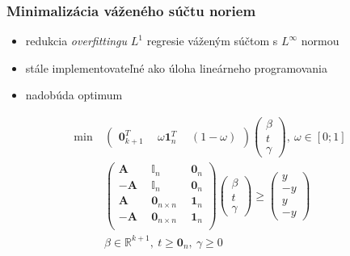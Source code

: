 \documentclass[presentation.tex]{subfiles}
\begin{document}
\begin{frame}
	\frametitle{Minimalizácia váženého súčtu noriem}
	
	\begin{itemize}
		\item redukcia \textit{overfittingu} $L^1$ regresie váženým súčtom s $L^{\infty}$ normou
		\item stále implementovateľné ako úloha lineárneho programovania
		\item nadobúda optimum
	\end{itemize}
{\scriptsize
	\setlength{\abovedisplayskip}{6pt}
	\setlength{\belowdisplayskip}{\abovedisplayskip}
	\setlength{\abovedisplayshortskip}{0pt}
	\setlength{\belowdisplayshortskip}{3pt}
\begin{align*}
	\text{min}~ &
	\left(
	\begin{array}{c|c|c}
		\mathbf{0}_{k+1}^T ~ & ~\omega\mathbf{1}_n^T ~& ~(1 - \omega)
	\end{array}
	\right)
	\left(
	\begin{array}{c}
		\beta \\
		\hline
		t \\
		\hline
		\gamma
	\end{array}
	\right), ~ \omega \in [0; 1]\\
	&\left(
	\begin{array}{c|c|c}
		\mathbf{A} ~&~ \mathbb{I}_n ~&~ \mathbf{0}_n \\
		\hline
		-\mathbf{A} ~&~ \mathbb{I}_n ~&~ \mathbf{0}_n \\
		\hline
		\mathbf{A} ~&~ \mathbf{0}_{n \times n} ~&~ \mathbf{1}_n \\
		\hline
		-\mathbf{A} ~&~ \mathbf{0}_{n \times n} ~&~ \mathbf{1}_n \\
	\end{array}
	\right)
	\left(
	\begin{array}{c}
		\beta \\
		\hline
		t \\
		\hline
		\gamma
	\end{array}
	\right)
	\geq
	\left(
	\begin{array}{c}
		y \\
		\hline
		-y \\
		\hline
		y \\
		\hline
		-y
	\end{array}
	\right) \\
	&\beta \in \mathbb{R}^{k+1},~t \geq \mathbf{0}_{n},~\gamma \geq 0
\end{align*}
}%
\end{frame}
\end{document}
